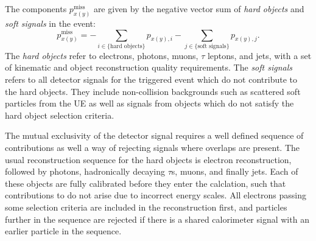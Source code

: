 The components $p^{\text{miss}}_{x(y)}$ are given by the negative vector sum of \textit{hard objects} and \textit{soft signals} in the event:
\begin{equation}
    p^{\text{miss}}_{x(y)}=-\sum_{i\in\{\text{hard objects}\}}p_{x(y),i}-\sum_{j\in\{\text{soft signals}\}}p_{x(y),j}.
\end{equation} 
The \textit{hard objects} refer to electrons, photons, muons, $\tau$ leptons, and jets, with a set of kinematic and object reconstruction quality requirements. The \textit{soft signals} refers to all detector signals for the triggered event which do not contribute to the hard objects. They include non-collision backgrounds such as scattered soft particles from the UE as well as signals from objects which do not satisfy the hard object selection criteria. 

The mutual exclusivity of the detector signal requires a well defined sequence of contributions as well a way of rejecting signals where overlaps are present. The usual reconstruction sequence for the hard objects is electron reconstruction, followed by photons, hadronically decaying $\tau$s, muons, and finally jets. Each of these objects are fully calibrated before they enter the \ptmiss calclation, such that contributions to \ptmiss do not arise due to incorrect energy scales. All electrons passing some selection criteria are included in the \ptmiss reconstruction first, and particles further in the sequence are rejected if there is a shared calorimeter signal with an earlier particle in the sequence. 

